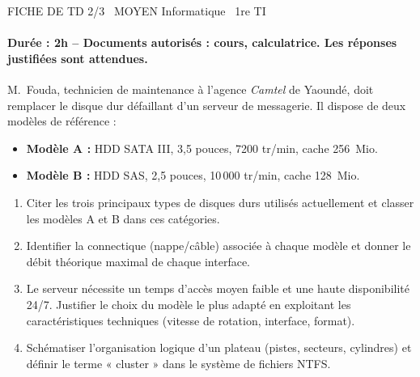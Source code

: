 \documentclass[11pt]{article}
\begin{document}
\begin{tcolorbox}[enhanced,colback=popink,colframe=popink,arc=10pt,boxrule=0pt,left=12pt,right=12pt,top=9pt,bottom=9pt]
{\color{white}\popxbold\small FICHE DE TD 2/3 \textbullet\ MOYEN \hfill Informatique \textbullet\ 1re TI\par}
\end{tcolorbox}
\vspace{4pt}
\paragraph{Durée : 2h -- Documents autorisés : cours, calculatrice. Les réponses justifiées sont attendues.}

\begin{exercice}
M.~Fouda, technicien de maintenance à l'agence \textit{Camtel} de Yaoundé, doit remplacer le disque dur défaillant d'un serveur de messagerie. Il dispose de deux modèles de référence : 
\begin{itemize}
    \item \textbf{Modèle A :} HDD SATA III, 3,5 pouces, 7200 tr/min, cache 256~Mio.
    \item \textbf{Modèle B :} HDD SAS, 2,5 pouces, 10\,000 tr/min, cache 128~Mio.
\end{itemize}
\begin{enumerate}
    \item Citer les trois principaux types de disques durs utilisés actuellement et classer les modèles A et B dans ces catégories.
    \item Identifier la connectique (nappe/câble) associée à chaque modèle et donner le débit théorique maximal de chaque interface.
    \item Le serveur nécessite un temps d'accès moyen faible et une haute disponibilité 24/7. Justifier le choix du modèle le plus adapté en exploitant les caractéristiques techniques (vitesse de rotation, interface, format).
    \item Schématiser l'organisation logique d'un plateau (pistes, secteurs, cylindres) et définir le terme « cluster » dans le système de fichiers NTFS.
\end{enumerate}
\end{exercice}
\end{document}
